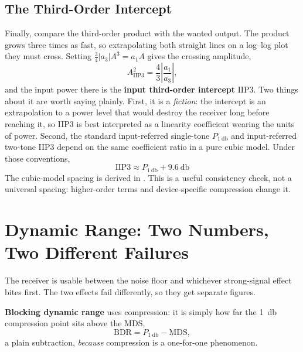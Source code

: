 \subsection{The Third-Order Intercept}
Finally, compare the third-order product with the wanted output. The product grows three
times as fast, so extrapolating both straight lines on a log--log plot they must cross.
Setting \(\tfrac34|a_3|A^3=a_1A\) gives the crossing amplitude,
\[
A_{\mathrm{IIP3}}^2=\frac{4}{3}\left|\frac{a_1}{a_3}\right|,
\]
and the input power there is the \textbf{input third-order intercept} \(\mathrm{IIP3}\).
Two things about it are worth saying plainly. First, it is a \emph{fiction}: the
intercept is an extrapolation to a power level that would destroy the receiver long
before reaching it, so IIP3 is best interpreted as a linearity coefficient wearing the units of
power. Second, the standard input-referred single-tone
\(P_{\SI{1}{\decibel}}\) and input-referred two-tone IIP3 depend on the same
coefficient ratio in a pure cubic model. Under those conventions,
\[
\mathrm{IIP3}\approx P_{\SI{1}{\decibel}}+\SI{9.6}{\decibel}
\]
The cubic-model spacing is derived in
\cite[pp.~102--103]{egan2003practical}.
This is a useful consistency check, not a universal spacing: higher-order terms and
device-specific compression change it.

\section{Dynamic Range: Two Numbers, Two Different Failures}
\label{sec:dynamicrange}
The receiver is usable between the noise floor and whichever strong-signal effect bites
first. The two effects fail differently, so they get separate figures.

\textbf{Blocking dynamic range} uses compression: it is simply how far the
\SI{1}{\decibel} compression point sits above the MDS,
\[
\mathrm{BDR}=P_{\SI{1}{\decibel}}-\mathrm{MDS},
\]
a plain subtraction, \emph{because} compression is a one-for-one phenomenon.

